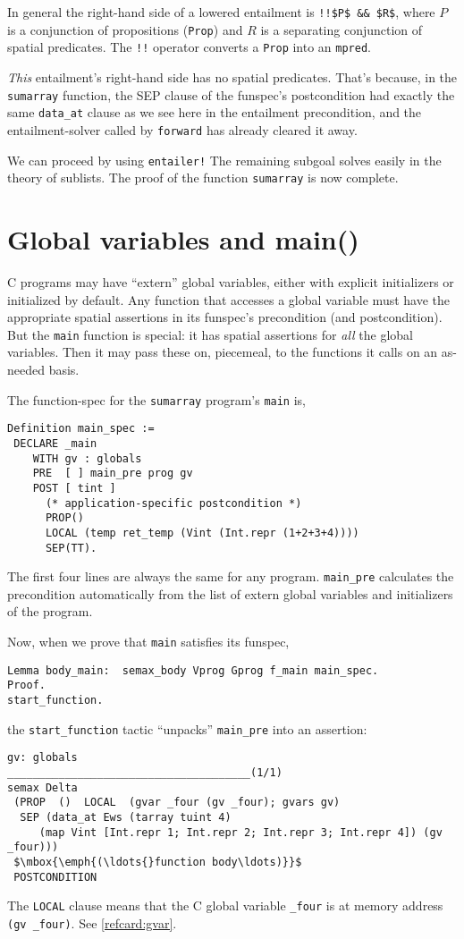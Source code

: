 \documentclass[12pt,fleqn,openany,oneside,showtrims]{memoir}
\begin{document}
In general the right-hand side of a lowered entailment is \lstinline{!!$P$ && $R$},
where $P$ is a conjunction of propositions (\lstinline{Prop})
and $R$ is a separating conjunction of spatial predicates.
The \lstinline{!!} operator converts a \lstinline{Prop} into
an \lstinline{mpred}.

\emph{This} entailment's right-hand side has no spatial
predicates.  That's because, in the \lstinline{sumarray} function,
the SEP clause of the
funspec's postcondition had exactly the same
\lstinline{data_at} clause as we see here in the
entailment precondition, and the entailment-solver
called by \lstinline{forward} has already cleared it away.

We can proceed by using \lstinline{entailer!}
The remaining subgoal solves easily in the
theory of sublists.  The proof of the function
\lstinline{sumarray} is now complete.

\chapter{Global variables and \upshape\textsf{main()}}
C programs may have ``extern'' global variables,
either with explicit initializers or initialized by
default.  Any function that accesses a global
variable must have the appropriate spatial
assertions in its funspec's precondition
(and postcondition).  But the \lstinline{main}
function is special: it has spatial
assertions for \emph{all} the global variables.
Then it may pass these on, piecemeal,
to the functions it calls on an as-needed basis.

The function-spec for the \lstinline{sumarray} program's \lstinline{main} is,
\begin{lstlisting}
Definition main_spec :=
 DECLARE _main  
    WITH gv : globals
    PRE  [ ] main_pre prog gv
    POST [ tint ]
      (* application-specific postcondition *)
      PROP()
      LOCAL (temp ret_temp (Vint (Int.repr (1+2+3+4))))
      SEP(TT).
\end{lstlisting}
The first four lines are always the same for any program.
\lstinline{main_pre} calculates the precondition
automatically from the list of extern global variables
and initializers of the program.\label{main-pre-page}

Now, when we prove that \lstinline{main} satisfies its
funspec,
\begin{lstlisting}
Lemma body_main:  semax_body Vprog Gprog f_main main_spec.
Proof.
start_function.
\end{lstlisting}
the \lstinline{start_function} tactic ``unpacks''
\lstinline{main_pre} into an assertion:
\pagebreak
\begin{lstlisting}
gv: globals
______________________________________(1/1)
semax Delta
 (PROP  ()  LOCAL  (gvar _four (gv _four); gvars gv)
  SEP (data_at Ews (tarray tuint 4)
     (map Vint [Int.repr 1; Int.repr 2; Int.repr 3; Int.repr 4]) (gv _four)))
 $\mbox{\emph{(\ldots{}function body\ldots)}}$
 POSTCONDITION
\end{lstlisting}
The \lstinline{LOCAL} clause means that the C global
variable \lstinline{_four} is at memory address
\lstinline{(gv _four)}.    See \autoref{refcard:gvar}.
\end{document}
